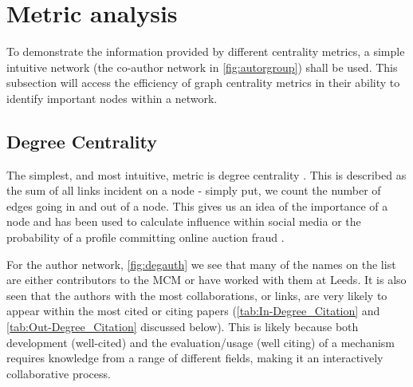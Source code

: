 

\section{Metric analysis}\label{sec:graphcentrality}

To demonstrate the information provided by different centrality metrics, a simple intuitive network (the co-author network in \autoref{fig:autorgroup}) shall be used. This subsection will access the efficiency of graph centrality metrics in their ability to identify important nodes within a network. 


\subsection{Degree Centrality}
The simplest, and most intuitive, metric is degree centrality \citep{degreefreeman}. This is described as the sum of all links incident on a node - simply put, we count the number of edges going in and out of a node. This gives us an idea of the importance of a node and has been used to calculate influence within social media or the probability of a profile committing online auction fraud \citep{degreetwitter,degreefreeman}.

For the author network, \autoref{fig:degauth} we see that many of the names on the list are either contributors to the MCM or have worked with them at Leeds. It is also seen that the authors with the most collaborations, or links, are very likely to appear within the most cited or citing papers (\autoref{tab:In-Degree_Citation} and \autoref{tab:Out-Degree_Citation} discussed below). This is likely because both development (well-cited) and the evaluation/usage (well citing) of a mechanism requires knowledge from a range of different fields, making it an interactively collaborative process. 

